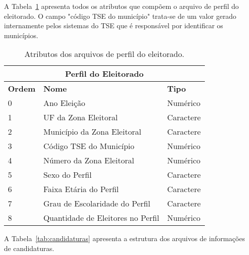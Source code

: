 A Tabela~\ref{tab:eleitorado} apresenta todos os atributos que compõem o arquivo de perfil do eleitorado. O campo "código TSE do município" trata-se de um valor gerado internamente pelos sistemas do TSE que é responsável por identificar os municípios.

\begin{table}[h!]
    \centering
    \begin{tabular}{|l|l|l|}
        \hline
        \multicolumn{3}{|c|}{\textbf{Perfil do Eleitorado}} \\
        \hline
        \textbf{Ordem} &  \textbf{Nome} & \textbf{Tipo}   \\
        \hline
        0 & Ano Eleição & Numérico \\
        \hline
        1 & UF da Zona Eleitoral & Caractere \\
        \hline
        2 & Município da Zona Eleitoral & Caractere \\
        \hline
        3 & Código TSE do Município & Numérico \\
        \hline
        4 & Número da Zona Eleitoral  & Numérico \\
        \hline
        5 & Sexo do Perfil & Caractere \\
        \hline
        6 & Faixa Etária do Perfil & Caractere \\
        \hline
        7 & Grau de Escolaridade do Perfil & Caractere \\
        \hline
        8 & Quantidade de Eleitores no Perfil & Numérico \\
        \hline
    \end{tabular}
    \caption{Atributos dos arquivos de perfil do eleitorado.}
    \label{tab:eleitorado}
\end{table}

A Tabela~\ref{tab:candidaturas} apresenta a estrutura dos arquivos de informações de candidaturas.

